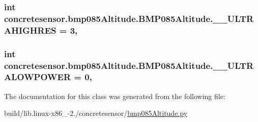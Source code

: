 \subsubsection[{\+\_\+\+\_\+\+U\+L\+T\+R\+A\+H\+I\+G\+H\+R\+E\+S}]{\setlength{\rightskip}{0pt plus 5cm}int concretesensor.\+bmp085\+Altitude.\+B\+M\+P085\+Altitude.\+\_\+\+\_\+\+U\+L\+T\+R\+A\+H\+I\+G\+H\+R\+E\+S = 3\hspace{0.3cm}{\ttfamily [static]}, {\ttfamily [private]}}\label{classconcretesensor_1_1bmp085Altitude_1_1BMP085Altitude_a77246647e9449a52131d3a552a8bc03d}
\hypertarget{classconcretesensor_1_1bmp085Altitude_1_1BMP085Altitude_a6ea10e6fd4afb2429bf607b7e06de42d}{}
\subsubsection[{\+\_\+\+\_\+\+U\+L\+T\+R\+A\+L\+O\+W\+P\+O\+W\+E\+R}]{\setlength{\rightskip}{0pt plus 5cm}int concretesensor.\+bmp085\+Altitude.\+B\+M\+P085\+Altitude.\+\_\+\+\_\+\+U\+L\+T\+R\+A\+L\+O\+W\+P\+O\+W\+E\+R = 0\hspace{0.3cm}{\ttfamily [static]}, {\ttfamily [private]}}\label{classconcretesensor_1_1bmp085Altitude_1_1BMP085Altitude_a6ea10e6fd4afb2429bf607b7e06de42d}


The documentation for this class was generated from the following file\+:\begin{DoxyCompactItemize}
\item 
build/lib.\+linux-\/x86\+\_-\/2./concretesensor/\hyperlink{build_2lib_8linux-x86__64-2_87_2concretesensor_2bmp085Altitude_8py}{bmp085\+Altitude.\+py}\end{DoxyCompactItemize}
